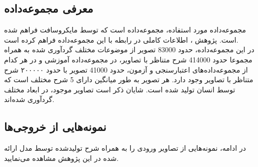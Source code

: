 \subsection{معرفی مجموعه‌داده}
مجموعه‌داده مورد استفاده، مجموعه‌داده  است که توسط مایکروسافت فراهم شده است. پژوهش \cite{lin2014microsoft}، اطلاعات کاملی در رابطه با این مجموعه‌داده فراهم کرده است. 
\\
در این مجموعه‌داده، حدود 83000 تصویر از موضوعات مختلف گردآوری شده به همراه مجموعا حدود 414000 شرح متناظر با تصاویر، در مجموعه‌داده آموزشی و در هر کدام از مجموعه‌داده‌های اعتبارسنجی و آزمون، حدود 41000 تصویر با حدود ۲۰۰۰۰۰ شرح متناظر با تصاویر وجود دارد. هر تصویر به طور میانگین دارای 5 شرح مختلف است که توسط انسان تولید شده است. شایان ذکر است تصاویر موجود، در ابعاد مختلف گرد‌آوری شده‌اند. 
\subsection{نمونه‌هایی از خروجی‌ها}
در ادامه، نمونه‌هایی از تصاویر ورودی را به همراه شرح تولید‌شده توسط مدل ارائه شده در این پژوهش مشاهده می‌نمایید. 
